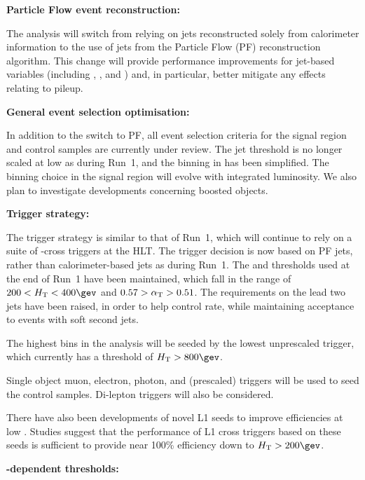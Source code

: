 {\bf Particle Flow event reconstruction:}

The analysis will switch from relying on jets reconstructed solely
from calorimeter information to the use of jets from the Particle Flow
(PF) reconstruction algorithm. This change will provide performance
improvements for jet-based variables (including \scalht, \mht, and
\alphat) and, in particular, better mitigate any effects relating to
pileup.

{\bf General event selection optimisation:}

In addition to the switch to PF, all event selection criteria for the
signal region and control samples are currently under review. The jet
\Pt threshold is no longer scaled at low \scalht as during Run~1, and
the binning in \scalht has been simplified. The binning choice in the
signal region will evolve with integrated luminosity.  We also plan to
investigate developments concerning \eg boosted objects.

{\bf Trigger strategy:}

The trigger strategy is similar to that of Run~1, which will continue
to rely on a suite of \scalht-\alphat cross triggers at the HLT. The
trigger decision is now based on PF jets, rather than
calorimeter-based jets as during Run~1. The \HT and \alphat thresholds
used at the end of Run~1 have been maintained, which fall in the range
of $200 < \scalht < 400\gev$ and $0.57 > \alpha_{\text{T}} > 0.51$. The \Pt
requirements on the lead two jets have been raised, in order to help
control rate, while maintaining acceptance to events with soft second
jets. 

The highest \scalht bins in the analysis will be seeded by the lowest
unprescaled \scalht trigger, which currently has a threshold of
$\scalht > 800\gev$.

Single object muon, electron, photon, and (prescaled) \HT triggers
will be used to seed the control samples. Di-lepton triggers will also
be considered. 

There have also been developments of novel L1 seeds to improve
efficiencies at low \scalht. Studies suggest that the performance of
L1 cross triggers based on these seeds is sufficient to provide near
100\% efficiency down to $\scalht > 200\gev$.

{\bf \scalht-dependent \alphat thresholds:}

